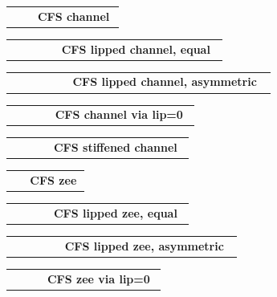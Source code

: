 \documentclass[11pt]{article}
\makeatletter
\newcommand{\ExampleRow}[3]{%
  \begin{tabular}{@{}m{0.22\linewidth}m{0.74\linewidth}@{}}
    \begin{tikzpicture}[baseline=(current bounding box.center)]
      #3
    \end{tikzpicture}
    &
    \textbf{#1}\par
    \vspace{2pt}
    {\raggedright\ttfamily\scriptsize\detokenize{#2}\par}
  \end{tabular}
  \par\vspace{8mm}
}
\makeatother
\begin{document}
\ExampleRow
  {CFS channel}
  {\TikZSectionsChannel[depth=180, flange=55, thickness=2, radius=4, scale=0.025]}
  {\TikZSectionsChannel[depth=180, flange=55, thickness=2, radius=4, scale=0.025]}

\ExampleRow
  {CFS lipped channel, equal}
  {\TikZSectionsChannel[depth=180, flange=55, lip=18, thickness=2, radius=4, scale=0.025]}
  {\TikZSectionsChannel[depth=180, flange=55, lip=18, thickness=2, radius=4, scale=0.025]}

\ExampleRow
  {CFS lipped channel, asymmetric}
  {\TikZSectionsChannel[detailed=true, depth=180, top flange=55, top lip=18, bottom flange=60, bottom lip=20, thickness=2, radius=4, scale=0.025]}
  {\TikZSectionsChannel[detailed=true, depth=180, top flange=55, top lip=18, bottom flange=60, bottom lip=20, thickness=2, radius=4, scale=0.025]}

\ExampleRow
  {CFS channel via lip=0}
  {\TikZSectionsChannel[depth=180, flange=55, lip=0, thickness=2, radius=4, scale=0.025]}
  {\TikZSectionsChannel[depth=180, flange=55, lip=0, thickness=2, radius=4, scale=0.025]}

\ExampleRow
  {CFS stiffened channel}
  {\TikZSectionsStiffenedChannel[detailed=true, depth=180, top flange=55, top lip=18, bottom flange=60, bottom lip=20, thickness=2, radius=4, stiffener position=0.55, scale=0.025]}
  {\TikZSectionsStiffenedChannel[detailed=true, depth=180, top flange=55, top lip=18, bottom flange=60, bottom lip=20, thickness=2, radius=4, stiffener position=0.55, scale=0.025]}

\ExampleRow
  {CFS zee}
  {\TikZSectionsZee[depth=180, flange=55, thickness=2, radius=4, scale=0.025]}
  {\TikZSectionsZee[depth=180, flange=55, thickness=2, radius=4, scale=0.025]}

\ExampleRow
  {CFS lipped zee, equal}
  {\TikZSectionsZee[depth=180, flange=55, lip=18, thickness=2, radius=4, scale=0.025]}
  {\TikZSectionsZee[depth=180, flange=55, lip=18, thickness=2, radius=4, scale=0.025]}

\ExampleRow
  {CFS lipped zee, asymmetric}
  {\TikZSectionsZee[detailed=true, depth=180, top flange=55, top lip=18, bottom flange=60, bottom lip=20, thickness=2, radius=4, scale=0.025]}
  {\TikZSectionsZee[detailed=true, depth=180, top flange=55, top lip=18, bottom flange=60, bottom lip=20, thickness=2, radius=4, scale=0.025]}

\ExampleRow
  {CFS zee via lip=0}
  {\TikZSectionsZee[depth=180, flange=55, lip=0, thickness=2, radius=4, scale=0.025]}
  {\TikZSectionsZee[depth=180, flange=55, lip=0, thickness=2, radius=4, scale=0.025]}
\end{document}
